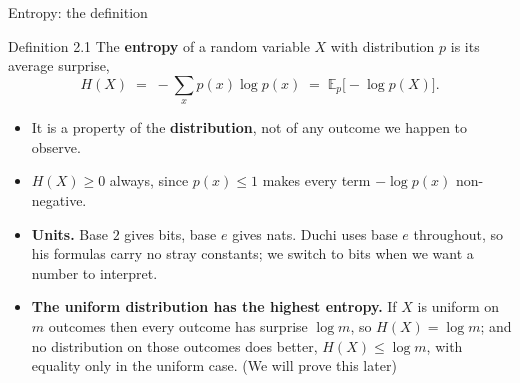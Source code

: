 \documentclass[aspectratio=169,9pt]{beamer}
\newcommand{\orange}[1]{\textcolor{AmazonOrange}{\textbf{#1}}}
\newcommand{\blue}[1]{\textcolor{densityblue}{\textbf{#1}}}
\newcommand{\E}{\mathbb{E}}
\begin{document}
\begin{frame}{Entropy: the definition}
\begin{block}{Definition 2.1}
The \orange{entropy} of a random variable $X$ with distribution $p$ is its average surprise,
\[
    H(X) \;=\; -\sum_x p(x)\log p(x) \;=\; \E_p\big[-\log p(X)\big].
\]
\end{block}
\pause
\begin{itemize}
    \item It is a property of the \blue{distribution}, not of any outcome we happen to observe.
    \pause
    \item $H(X) \ge 0$ always, since $p(x) \le 1$ makes every term $-\log p(x)$ non-negative.
    \pause
    \item \orange{Units.} Base $2$ gives bits, base $e$ gives nats. Duchi uses base $e$ throughout, so his
    formulas carry no stray constants; we switch to bits when we want a number to interpret.
    \pause
    \item \orange{The uniform distribution has the highest entropy.} If $X$ is uniform on $m$ outcomes then
    every outcome has surprise $\log m$, so $H(X) = \log m$; and no distribution on those outcomes does
    better, $H(X) \le \log m$, with equality only in the uniform case. (We will prove this later)
\end{itemize}
\end{frame}
\end{document}
